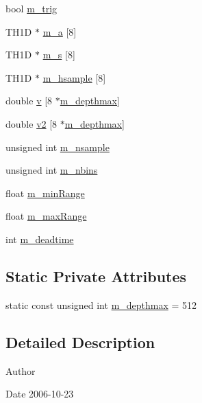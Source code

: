 \begin{DoxyCompactItemize}
bool \hyperlink{classAcquisition_a953bdc1bf56206b6df33b648af32a24f}{m\+\_\+trig}
\item 
T\+H1D $\ast$ \hyperlink{classAcquisition_a88963f722bfcde824882f6312a44e825}{m\+\_\+a} \mbox{[}8\mbox{]}
\item 
T\+H1D $\ast$ \hyperlink{classAcquisition_a15d71455f658e21a12ef4c153c21df65}{m\+\_\+s} \mbox{[}8\mbox{]}
\item 
T\+H1D $\ast$ \hyperlink{classAcquisition_a53bcc000575de30eba6b7db8209be2cc}{m\+\_\+hsample} \mbox{[}8\mbox{]}
\item 
double \hyperlink{classAcquisition_a8f0ef9898c1e63fb6f13c14508d3180d}{v} \mbox{[}8 $\ast$\hyperlink{classAcquisition_a7d95ba9a5593451a73754ed44f6bcd1c}{m\+\_\+depthmax}\mbox{]}
\item 
double \hyperlink{classAcquisition_a841316dcf4f210ad52b144b187f2b7b6}{v2} \mbox{[}8 $\ast$\hyperlink{classAcquisition_a7d95ba9a5593451a73754ed44f6bcd1c}{m\+\_\+depthmax}\mbox{]}
\item 
unsigned int \hyperlink{classAcquisition_a26d0f1a44309ffac49c365b7ee568ab2}{m\+\_\+nsample}
\item 
unsigned int \hyperlink{classAcquisition_a05bccdc4b9ada37beaeba8794ccef12d}{m\+\_\+nbins}
\item 
float \hyperlink{classAcquisition_a06b3ea027ebdcb15f64a6517ceb99b76}{m\+\_\+min\+Range}
\item 
float \hyperlink{classAcquisition_a45478629e9db582470b4b158edb46616}{m\+\_\+max\+Range}
\item 
int \hyperlink{classAcquisition_a5f7fe20506e7d860ed61935255adfe17}{m\+\_\+deadtime}
\end{DoxyCompactItemize}
\subsection*{Static Private Attributes}
\begin{DoxyCompactItemize}
\item 
static const unsigned int \hyperlink{classAcquisition_a7d95ba9a5593451a73754ed44f6bcd1c}{m\+\_\+depthmax} = 512
\end{DoxyCompactItemize}


\subsection{Detailed Description}
\begin{DoxyAuthor}{Author}

\end{DoxyAuthor}
\begin{DoxyDate}{Date}
2006-\/10-\/23 
\end{DoxyDate}



